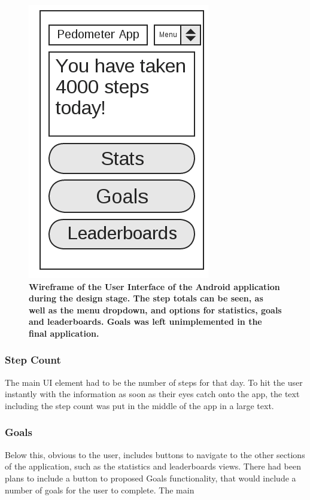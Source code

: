 \documentclass{l4proj}
\begin{document}
\begin{figure}[H]
\centering
\includegraphics[scale=0.7]{images/diagrams/appwireframe.png}
\caption{\textbf{Wireframe of the User Interface of the Android application during the design stage. The step totals can be seen, as well as the menu dropdown, and options for statistics, goals and leaderboards. Goals was left unimplemented in the final application.}}
\label{design:appwireframe}
\end{figure}

\subsubsection{Step Count}

The main UI element had to be the number of steps for that day. To hit the user instantly with the information as soon as their eyes catch onto the app, the text including the step count was put in the middle of the app in a large text.

\subsubsection{Goals}

Below this, obvious to the user, includes buttons to navigate to the other sections of the application, such as the statistics and leaderboards views. There had been plans to include a button to proposed Goals functionality, that would include a number of goals for the user to complete. The main 
\end{document}
